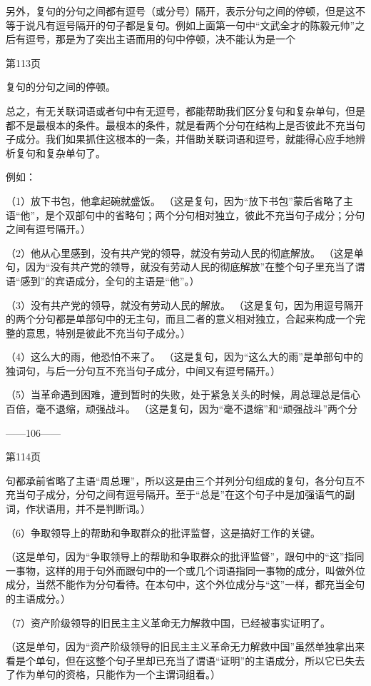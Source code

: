 另外，复句的分句之间都有逗号（或分号）隔开，表示分句之间的停顿，但是这不等于说凡有逗号隔开的句子都是复句。例如上面第一句中“文武全才的陈毅元帅”之后有逗号，那是为了突出主语而用的句中停顿，决不能认为是一个

第113页

复句的分句之间的停顿。

总之，有无关联词语或者句中有无逗号，都能帮助我们区分复句和复杂单句，但是都不是最根本的条件。最根本的条件，就是看两个分句在结构上是否彼此不充当句子成分。我们如果抓住这根本的一条，并借助关联词语和逗号，就能得心应手地辨析复句和复杂单句了。

例如：

（1）放下书包，他拿起碗就盛饭。
（这是复句，因为“放下书包”蒙后省略了主语“他”，是个双部句中的省略句；两个分句相对独立，彼此不充当句子成分；分句之间有逗号隔开。）

（2）他从心里感到，没有共产党的领导，就没有劳动人民的彻底解放。
（这是单句，因为“没有共产党的领导，就没有劳动人民的彻底解放”在整个句子里充当了谓语“感到”的宾语成分，全句的主语是“他”。）

（3）没有共产党的领导，就没有劳动人民的解放。
（这是复句，因为用逗号隔开的两个分句都是单部句中的无主句，而且二者的意义相对独立，合起来构成一个完整的意思，特别是彼此不充当句子成分。）

（4）这么大的雨，他恐怕不来了。
（这是复句，因为“这么大的雨”是单部句中的独词句，与后一分句互不充当句子成分，中间又有逗号隔开。）

（5）当革命遇到困难，遭到暂时的失败，处于紧急关头的时候，周总理总是信心百倍，毫不退缩，顽强战斗。
（这是复句，因为“毫不退缩”和“顽强战斗”两个分

——106——

第114页

句都承前省略了主语“周总理”，所以这是由三个并列分句组成的复句，各分句互不充当句子成分，分句之间有逗号隔开。至于“总是”在这个句子中是加强语气的副词，作状语用，并不是判断词。）

（6）争取领导上的帮助和争取群众的批评监督，这是搞好工作的关键。

（这是单句，因为“争取领导上的帮助和争取群众的批评监督”，跟句中的“这”指同一事物，这样的用于句外而跟句中的一个或几个词语指同一事物的成分，叫做外位成分，当然不能作为分句看待。在本句中，这个外位成分与“这”一样，都充当全句的主语成分。）

（7）资产阶级领导的旧民主主义革命无力解救中国，已经被事实证明了。

（这是单句，因为“资产阶级领导的旧民主主义革命无力解救中国”虽然单独拿出来看是个单句，但在这整个句子里却已充当了谓语“证明”的主语成分，所以它已失去了作为单句的资格，只能作为一个主谓词组看。）

